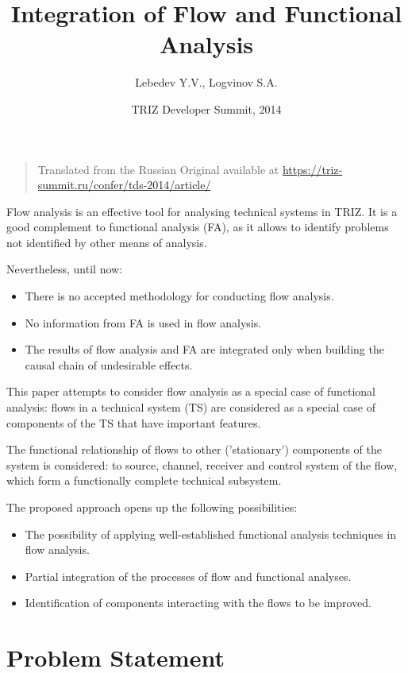 \documentclass[a4paper,11pt]{article}
\author{Lebedev Y.V., Logvinov S.A.}
\title{Integration of Flow and Functional Analysis}
\date{TRIZ Developer Summit, 2014}
\begin{document}
\maketitle

\begin{quote}
  Translated from the Russian Original available at
  \url{https://triz-summit.ru/confer/tds-2014/article/} 
\end{quote}

Flow analysis is an effective tool for analysing technical systems in TRIZ. It
is a good complement to functional analysis (FA), as it allows to identify
problems not identified by other means of analysis.

Nevertheless, until now:
\begin{itemize}
\item There is no accepted methodology for conducting flow analysis.
\item No information from FA is used in flow analysis.
\item The results of flow analysis and FA are integrated only when building
  the causal chain of undesirable effects.
\end{itemize}

This paper attempts to consider flow analysis as a special case of functional
analysis: flows in a technical system (TS) are considered as a special case of
components of the TS that have important features.

The functional relationship of flows to other ('stationary') components of the
system is considered: to source, channel, receiver and control system of the
flow, which form a functionally complete technical subsystem.

The proposed approach opens up the following possibilities:
\begin{itemize}
\item The possibility of applying well-established functional analysis
  techniques in flow analysis.
\item Partial integration of the processes of flow and functional analyses.
\item Identification of components interacting with the flows to be improved.
\end{itemize}

\section*{Problem Statement}
\end{document}
